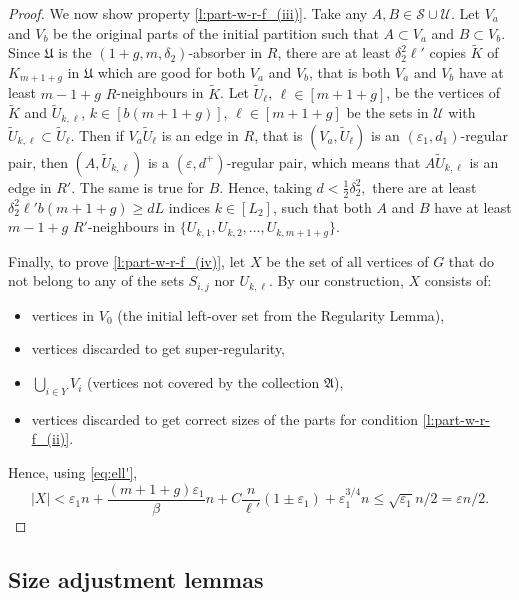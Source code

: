 \documentclass[reqno, 12pt]{amsart}
\numberwithin{equation}{section}
\numberwithin{figure}{section}
\theoremstyle{plain}
\theoremstyle{definition}
\let\eps=\varepsilon
\def\cS{{\mathcal S}}
\def\cU{{\mathcal U}}
\def\fA{\mathfrak{A}}
\def\fU{\mathfrak{U}}
\begin{document}
\begin{proof}
         We now show property \ref{l:part-w-r-f_(iii)}. Take any $A, B\in \cS\cup\cU$. Let $V_a$ and $V_b$ be the original parts of the initial partition such that $A\subset V_a$ and $B \subset V_b$. Since $\fU$ is the $(1+g,m,\delta_2)$-absorber in $R$, there are at least $\delta_2^2\ell'$ copies $\tilde{K}$ of $K_{m+1+g}$ in $\fU$ which are good for both $V_a$ and $V_b$, that is both $V_a$ and $V_b$ have at least $m-1+g$ $R$-neighbours in $\tilde{K}$. Let $\tilde{U}_\ell$, $\ell\in[m+1+g]$, be the vertices of $\tilde{K}$ and $\tilde{U}_{k,\ell}$, $k\in\left[b(m+1+g) \right]$, $\ell\in[m+1+g]$ be the sets in $\cU$ with $\tilde{U}_{k,\ell} \subset \tilde{U}_\ell$. Then if $V_a\tilde{U}_
        \ell$ is an edge in $R$, that is $(V_a,\tilde{U}_
        \ell)$ is an $(\eps_1, d_1)$-regular pair, then $(A, \tilde{U}_{k,\ell})$ is a $\left(\eps, d^+\right)$-regular pair, which means that $A\tilde{U}_{k,\ell}$ is an edge in $R'$. The same is true for $B$. Hence, taking $d<\frac 12 \delta_2^2,$ there are at least $\delta_2^2\ell'b(m+1+g) \geq dL$ indices $k\in[L_2]$, such that both $A$ and $B$ have at least $m-1+g$ $R'$-neighbours in $\{U_{k,1}, U_{k,2},\dots,U_{k,m+1+g}\}$. 

        Finally, to prove \ref{l:part-w-r-f_(iv)}, let $X$ be the set of all vertices of $G$ that do not belong to any of the sets $S_{i,j}$ nor $U_{k,\ell}$. By our construction, $X$ consists of:
         \begin{itemize}
             \item vertices in $V_0$ (the initial left-over set from the Regularity Lemma),
             \item vertices discarded to get super-regularity,
             \item $\bigcup_{i\in Y}V_i$ (vertices not covered by the collection $\fA$),
             \item vertices discarded to get correct sizes of the parts for condition \ref{l:part-w-r-f_(ii)}.
         \end{itemize}
         Hence, using \eqref{eq:ell'},
         \[ |X|< \eps_1 n + \frac{(m+1+g)\eps_1}{\beta}n + C\frac{n}{\ell'}(1\pm\eps_1) + \eps_1^{3/4}n \leq \sqrt{\eps_1} n/2 = \eps n/2.\]
        \end{proof}



    \subsection{Size adjustment lemmas}
\end{document}
